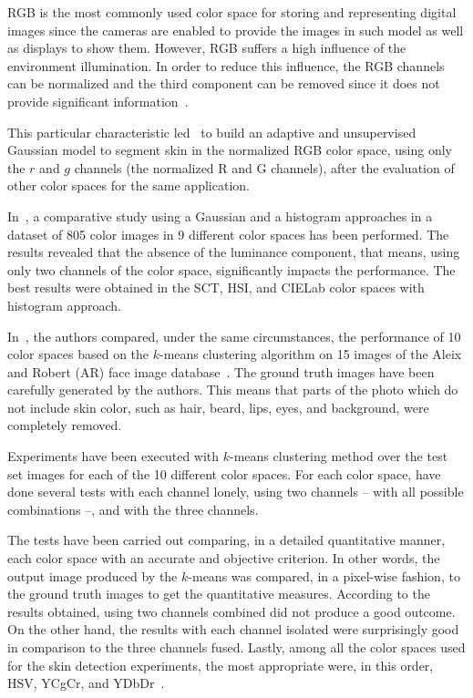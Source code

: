 RGB is the most commonly used color space for storing and representing digital images since the cameras are enabled to provide the images in such model as well as displays to show them. However, RGB suffers a high influence of the environment illumination. In order to reduce this influence, the RGB channels can be normalized and the third component can be removed since it does not provide significant information~\citep{kakumanu:07}.

This particular characteristic led~\citet{bergasa:00} to build an adaptive and unsupervised Gaussian model to segment skin in the normalized RGB color space, using only the $r$ and $g$ channels (the normalized R and G channels), after the evaluation of other color spaces for the same application.

In~\citet{jayaram:04}, a comparative study using a Gaussian and a histogram approaches in a dataset of 805 color images in 9 different color spaces has been performed. The results revealed that the absence of the luminance component, that means, using only two channels of the color space, significantly impacts the performance. The best results were obtained in the SCT, HSI, and CIELab color spaces with histogram approach.

In~\citet{chaves:10}, the authors compared, under the same circumstances, the performance of 10 color spaces based on the $k$-means clustering algorithm on 15 images of the Aleix and Robert (AR) face image database~\citep{ar-face-database:98}. The ground truth images have been carefully generated by the authors. This means that parts of the photo which do not include skin color, such as hair, beard, lips, eyes, and background, were completely removed.

Experiments have been executed with $k$-means clustering method over the test set images for each of the 10 different color spaces. For each color space, \citet{chaves:10} have done several tests with each channel lonely, using two channels -- with all possible combinations --, and with the three channels.

The tests have been carried out comparing, in a detailed quantitative manner, each color space with an accurate and objective criterion. In other words, the output image produced by the $k$-means was compared, in a pixel-wise fashion, to the ground truth images to get the quantitative measures. According to the results obtained, using two channels combined did not produce a good outcome. On the other hand, the results with each channel isolated were surprisingly good in comparison to the three channels fused. Lastly, among all the color spaces used for the skin detection experiments, the most appropriate were, in this order, HSV, YCgCr, and YDbDr~\citep{chaves:10}.

